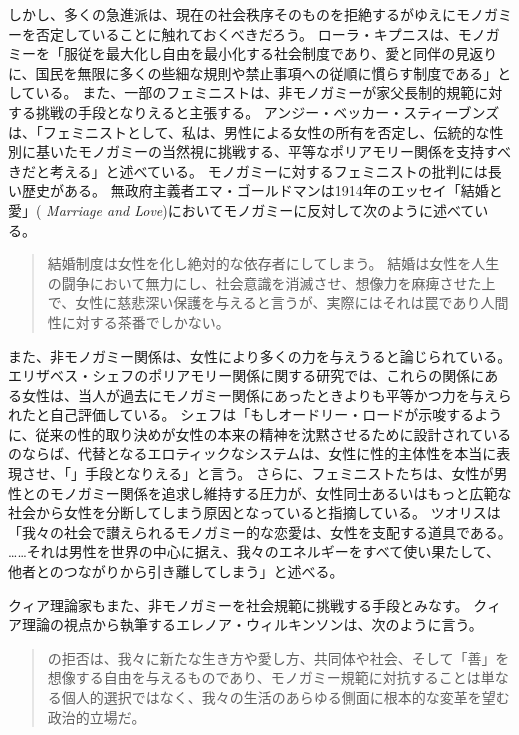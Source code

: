 \documentclass[paper=a4,book,openany]{jlreq}
\newcommand{\ig}[1]{}           %
\begin{document}
しかし、多くの急進派は、現在の社会秩序そのものを拒絶するがゆえにモノガミーを否定していることに触れておくべきだろう。
ローラ・キプニスは、モノガミーを「服従を最大化し自由を最小化する社会制度であり、愛と同伴の見返りに、国民を無限に多くの些細な規則や禁止事項への従順に慣らす制度である」としている\citep{kipnis03:_troub_marriag}。
また、一部のフェミニストは、非モノガミーが家父長制的規範に対する挑戦の手段となりえると主張する。
アンジー・ベッカー・スティーブンズは、「フェミニストとして、私は、男性による女性の所有を否定し、伝統的な性別に基いたモノガミーの当然視に挑戦する、平等なポリアモリー関係を支持すべきだと考える」と述べている\citep{stevens13:_shoul_femin_be_critic_compul_monog}。
モノガミーに対するフェミニストの批判には長い歴史がある。
無政府主義者エマ・ゴールドマンは1914年のエッセイ「結婚と愛」( \emph{Marriage and Love})においてモノガミーに反対して次のように述べている。

\begin{quote}
結婚制度は女性を化し絶対的な依存者にしてしまう。
結婚は女性を人生の闘争において無力にし、社会意識を消滅させ、想像力を麻痺させた上で、女性に慈悲深い保護を与えると言うが、実際にはそれは罠であり人間性に対する茶番でしかない。
\citep{goldman14:_marriag_love}\ig{Emma Goldman}
\end{quote}

また、非モノガミー関係は、女性により多くの力を与えうると論じられている。
エリザベス・シェフのポリアモリー関係に関する研究では、これらの関係にある女性は、当人が過去にモノガミー関係にあったときよりも平等かつ力を与えられたと自己評価している。
シェフは「もしオードリー・ロードが示唆するように、従来の性的取り決めが女性の本来の精神を沈黙させるために設計されているのならば、代替となるエロティックなシステムは、女性に性的主体性を本当に表現させ、「」手段となりえる」と言う\citep[p.6]{sheff05:_polyam_women_sexual_subjec_power}。
さらに、フェミニストたちは、女性が男性とのモノガミー関係を追求し維持する圧力が、女性同士あるいはもっと広範な社会から女性を分断してしまう原因となっていると指摘している\citep{rosa94:_anti}。
ツオリスは「我々の社会で讃えられるモノガミー的な恋愛は、女性を支配する道具である。
……それは男性を世界の中心に据え、我々のエネルギーをすべて使い果たして、他者とのつながりから引き離してしまう」と述べる\citep[p.25]{tsoulis87:_heter}。

クィア理論家もまた、非モノガミーを社会規範に挑戦する手段とみなす。
クィア理論の視点から執筆するエレノア・ウィルキンソンは、次のように言う。

\begin{quote}

  の拒否は、我々に新たな生き方や愛し方、共同体や社会、そして「善」を想像する自由を与えるものであり、モノガミー規範に対抗することは単なる個人的選択ではなく、我々の生活のあらゆる側面に根本的な変革を望む政治的立場だ。
\citep[p.344]{wilkinson10:_whats_queer_non_monog_now}

\end{quote}
\end{document}
